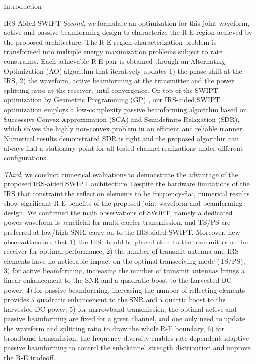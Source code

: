 \documentclass[journal]{IEEEtran}
\begin{document}
\begin{section}{Introduction}
\begin{subsection}{IRS-Aided SWIPT}
			\textit{Second}, we formulate an optimization for this joint waveform, active and passive beamforming design to characterize the R-E region achieved by the proposed architecture. The R-E region characterization problem is transformed into multiple energy maximization problems subject to rate constraints. Each achievable R-E pair is obtained through an Alternating Optimization (AO) algorithm that iteratively updates 1) the phase shift at the IRS, 2) the waveform, active beamforming at the transmitter and the power splitting ratio at the receiver, until convergence. On top of the SWIPT optimization by Geometric Programming (GP) \cite{Clerckx2018b}, our IRS-aided SWIPT optimization employs a low-complexity passive beamforming algorithm based on Successive Convex Approximation (SCA) and Semidefinite Relaxation (SDR), which solves the highly non-convex problem in an efficient and reliable manner. Numerical results demonstrated SDR is tight and the proposed algorithm can always find a stationary point for all tested channel realizations under different configurations.

			\textit{Third}, we conduct numerical evaluations to demonstrate the advantage of the proposed IRS-aided SWIPT architecture. Despite the hardware limitations of the IRS that constraint the reflection elements to be frequency-flat, numerical results show significant R-E benefits of the proposed joint waveform and beamforming design. We confirmed the main observations of SWIPT, namely a dedicated power waveform is beneficial for multi-carrier transmission, and TS/PS are preferred at low/high SNR, carry on to the IRS-aided SWIPT. Moreover, new observations are that 1) the IRS should be placed close to the transmitter or the receiver for optimal performance, 2) the number of transmit antenna and IRS elements have no noticeable impact on the optimal transceiving mode (TS/PS), 3) for active beamforming, increasing the number of transmit antennas brings a linear enhancement to the SNR and a quadratic boost to the harvested DC power, 4) for passive beamforming, increasing the number of reflecting elements provides a quadratic enhancement to the SNR and a quartic boost to the harvested DC power, 5) for narrowband transmission, the optimal active and passive beamforming are fixed for a given channel, and one only need to update the waveform and splitting ratio to draw the whole R-E boundary, 6) for broadband transmission, the frequency diversity enables rate-dependent adaptive passive beamforming to control the subchannel strength distribution and improve the R-E tradeoff.


\end{subsection}
\end{section}
\end{document}
